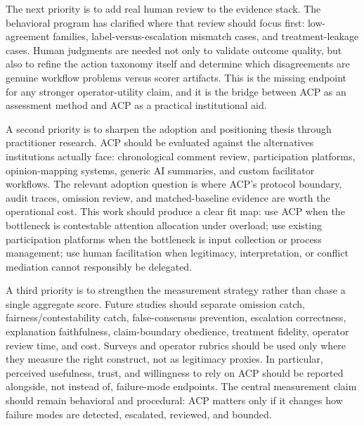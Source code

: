 \documentclass[11pt]{article}
\newcommand{\subsectiongray}[1]{%
  \vspace{2.5ex plus 0.5ex}%
  \noindent{\normalfont\large\color{gray}#1}%
  \vspace{0.6ex}\par\noindent%
}
\begin{document}
\subsectiongray{Future Work}

The next priority is to add real human review to the evidence stack. The behavioral program has clarified where that review should focus first: low-agreement families, label-versus-escalation mismatch cases, and treatment-leakage cases. Human judgments are needed not only to validate outcome quality, but also to refine the action taxonomy itself and determine which disagreements are genuine workflow problems versus scorer artifacts. This is the missing endpoint for any stronger operator-utility claim, and it is the bridge between ACP as an assessment method and ACP as a practical institutional aid.

\vspace{0.1in}
A second priority is to sharpen the adoption and positioning thesis through practitioner research. ACP should be evaluated against the alternatives institutions actually face: chronological comment review, participation platforms, opinion-mapping systems, generic AI summaries, and custom facilitator workflows. The relevant adoption question is where ACP's protocol boundary, audit traces, omission review, and matched-baseline evidence are worth the operational cost. This work should produce a clear fit map: use ACP when the bottleneck is contestable attention allocation under overload; use existing participation platforms when the bottleneck is input collection or process management; use human facilitation when legitimacy, interpretation, or conflict mediation cannot responsibly be delegated.

\vspace{0.1in}
A third priority is to strengthen the measurement strategy rather than chase a single aggregate score. Future studies should separate omission catch, fairness/contestability catch, false-consensus prevention, escalation correctness, explanation faithfulness, claim-boundary obedience, treatment fidelity, operator review time, and cost. Surveys and operator rubrics should be used only where they measure the right construct, not as legitimacy proxies. In particular, perceived usefulness, trust, and willingness to rely on ACP should be reported alongside, not instead of, failure-mode endpoints. The central measurement claim should remain behavioral and procedural: ACP matters only if it changes how failure modes are detected, escalated, reviewed, and bounded.
\end{document}

